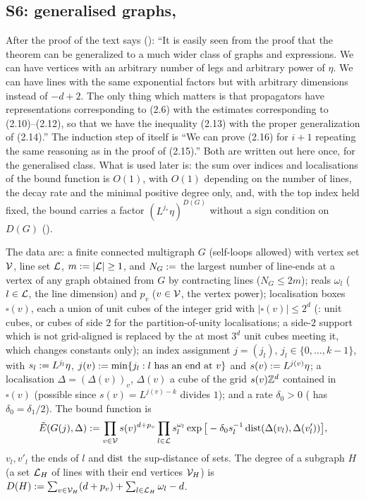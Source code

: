 
\subsection{S6: generalised graphs, \cite[Prop.~2.2]{Ba3}}\label{sup2:ssec:S6}

After the proof of \cite[Prop.~2.1]{Ba3} the text says (\cite[p.~428]{Ba3}): ``It is easily seen from the proof that the theorem can be generalized to a much wider class of graphs and expressions. We can have vertices with an arbitrary number of legs and arbitrary power of $\eta$. We can have lines with the same exponential factors but with arbitrary dimensions instead of $-d+2$. The only thing which matters is that propagators have representations corresponding to (2.6) with the estimates corresponding to (2.10)--(2.12), so that we have the inequality (2.13) with the proper generalization of (2.14).'' The induction step of \cite[Prop.~2.1]{Ba3} itself is ``We can prove (2.16) for $i+1$ repeating the same reasoning as in the proof of (2.15).'' Both are written out here once, for the generalised class. What is used later is: the sum over indices and localisations of the bound function is $O(1)$, with $O(1)$ depending on the number of lines, the decay rate and the minimal positive degree only, and, with the top index held fixed, the bound carries a factor $(L^{j_*}\eta)^{D(G)}$ without a sign condition on $D(G)$ (\cite[(3.4)--(3.5)]{Ba3}).

\begin{definition}\label{sup2:def:S6bf}
The data are: a finite connected multigraph $G$ (self-loops allowed) with vertex set $\mathcal V$, line set $\mathcal L$, $m:=|\mathcal L|\ge1$, and $N_G:=$ the largest number of line-ends at a vertex of any graph obtained from $G$ by contracting lines ($N_G\le2m$); reals $\omega_l$ ($l\in\mathcal L$, the line dimension) and $p_v$ ($v\in\mathcal V$, the vertex power); localisation boxes $\square(v)$, each a union of unit cubes of the integer grid with $|\square(v)|\le2^d$ (\cite[p.~420]{Ba3}: unit cubes, or cubes of side $2$ for the partition-of-unity localisations; a side-$2$ support which is not grid-aligned is replaced by the at most $3^d$ unit cubes meeting it, which changes constants only); an index assignment $j=(j_l)$, $j_l\in\{0,\dots,k-1\}$, with $s_l:= L^{j_l}\eta$, $j(v):=\min\{j_l:l\text{ has an end at }v\}$ and $s(v):= L^{j(v)}\eta$; a localisation $\Delta=(\Delta(v))_v$, $\Delta(v)$ a cube of the grid $s(v)\mathbb Z^d$ contained in $\square(v)$ (possible since $s(v)=L^{j(v)-k}$ divides $1$); and a rate $\delta_0>0$ (\cite[(2.14)]{Ba3} has $\delta_0=\delta_1/2$). The bound function is
\[
\tilde E(G(j),\Delta):=\prod_{v\in\mathcal V}s(v)^{d+p_v}\prod_{l\in\mathcal L}s_l^{\omega_l}\exp\big[-\delta_0s_l^{-1}\operatorname{dist}(\Delta(v_l),\Delta(v'_l))\big],
\]
$v_l,v'_l$ the ends of $l$ and $\operatorname{dist}$ the sup-distance of sets. The degree of a subgraph $H$ (a set $\mathcal L_H$ of lines with their end vertices $\mathcal V_H$) is $D(H):=\sum_{v\in\mathcal V_H}(d+p_v)+\sum_{l\in\mathcal L_H}\omega_l-d$.
\end{definition}

